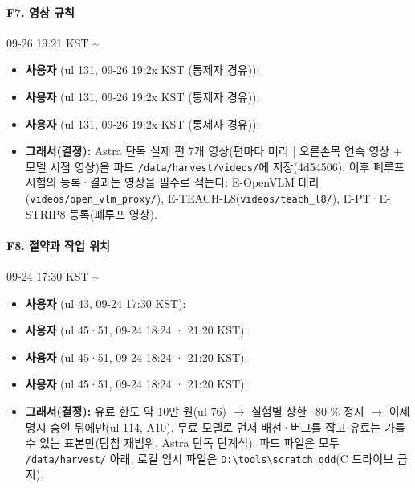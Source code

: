 \paragraph{F7. 영상 규칙}
{\small 09-26 19:21 KST \textasciitilde{}}
\begin{itemize}
  \item \textbf{사용자} (ul 131, 09-26 19:2x KST (통제자 경유)): 
  \item \textbf{사용자} (ul 131, 09-26 19:2x KST (통제자 경유)): 
  \item \textbf{사용자} (ul 131, 09-26 19:2x KST (통제자 경유)): 
  \item \textbf{그래서(결정):} Astra 단독 실제 편 7개 영상(편마다 머리 | 오른손목 연속 영상 + 모델 시점 영상)을 파드 \texttt{/\allowbreak{}data/\allowbreak{}harvest/\allowbreak{}videos/\allowbreak{}}에 저장(4d54506). 이후 폐루프 시험의 등록·결과는 영상을 필수로 적는다: E-OpenVLM 대리(\texttt{videos/\allowbreak{}open\_\allowbreak{}vlm\_\allowbreak{}proxy/\allowbreak{}}), E-TEACH-L8(\texttt{videos/\allowbreak{}teach\_\allowbreak{}l8/\allowbreak{}}), E-PT·E-STRIP8 등록(폐루프 영상).
\end{itemize}

\paragraph{F8. 절약과 작업 위치}
{\small 09-24 17:30 KST \textasciitilde{}}
\begin{itemize}
  \item \textbf{사용자} (ul 43, 09-24 17:30 KST): 
  \item \textbf{사용자} (ul 45·51, 09-24 18:24 · 21:20 KST): 
  \item \textbf{사용자} (ul 45·51, 09-24 18:24 · 21:20 KST): 
  \item \textbf{사용자} (ul 45·51, 09-24 18:24 · 21:20 KST): 
  \item \textbf{그래서(결정):} 유료 한도 약 10만 원(ul 76) $\rightarrow$ 실험별 상한·80 \% 정지 $\rightarrow$ 이제 명시 승인 뒤에만(ul 114, A10). 무료 모델로 먼저 배선·버그를 잡고 유료는 가를 수 있는 표본만(탐침 재범위, Astra 단독 단계식). 파드 파일은 모두 \texttt{/\allowbreak{}data/\allowbreak{}harvest/\allowbreak{}} 아래, 로컬 임시 파일은 \texttt{D:\textbackslash{}tools\textbackslash{}scratch\_\allowbreak{}qdd}(C 드라이브 금지).
\end{itemize}

